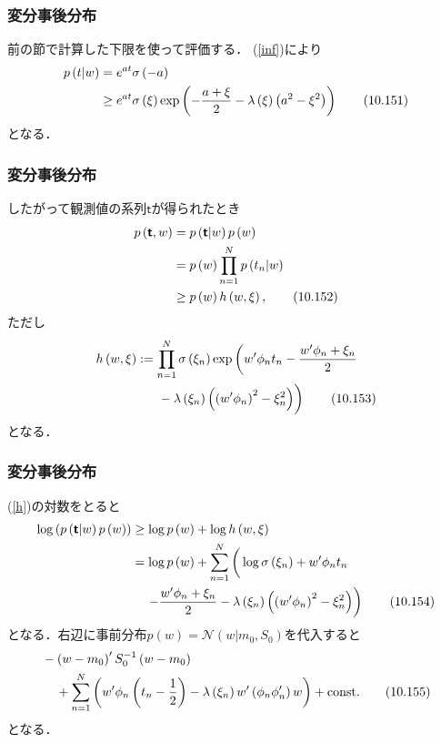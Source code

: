 \documentclass[10pt,usepdftitle=false,hyperref={unicode}]{beamer}
\newcommand{\paref}[1]{{\fontfamily{cmr}\selectfont (\ref{#1})}}
\newcommand{\parentheses}[1]{\left(#1\right)}
\newcommand{\const}{\mathrm{const.}}
\begin{document}
\begin{frame}
\frametitle{変分事後分布}
前の節で計算した下限を使って評価する．
\paref{inf}により
\begin{align}
    p\parentheses{t|w}
    &= e^{at}\sigma\parentheses{-a} \notag \\
    &\geq e^{at} \sigma\parentheses{\xi}\exp\parentheses{-\frac{a + \xi}{2} - \lambda\parentheses{\xi}\parentheses{a^2 - \xi^2}} \tag{10.151}
\end{align}
となる．
\end{frame}

\begin{frame}
\frametitle{変分事後分布}
したがって観測値の系列$\bm{\mathsf{t}}$が得られたとき
\begin{align}
    p\parentheses{\bm{\mathsf{t}},w}
    &= p\parentheses{\bm{\mathsf{t}}|w}p\parentheses{w} \notag \\
    &= p\parentheses{w} \prod_{n = 1}^N p\parentheses{t_n|w} \notag \\
    &\geq p\parentheses{w} h\parentheses{w,\xi}, \tag{10.152}
\end{align}
ただし
\begin{align}
    h\parentheses{w,\xi} &:= \prod_{n = 1}^N \sigma\parentheses{\xi_n}\exp\left( w'\phi_n t_n -\frac{w'\phi_n + \xi_n}{2}\right. \notag \\
                         &\phantom{:=}\ \left. \vphantom{\frac{w'\phi_n + \xi_n}{2}}
    - \lambda\parentheses{\xi_n}\parentheses{\parentheses{w'\phi_n}^2 - \xi_n^2}\right) \tag{10.153} \label{h}
\end{align}
となる．
\end{frame}

\begin{frame}
\frametitle{変分事後分布}
\paref{h}の対数をとると
\begin{align}
    \log\parentheses{p\parentheses{\bm{\mathsf{t}}|w}p\parentheses{w}}
    &\geq \log p\parentheses{w} + \log h\parentheses{w,\xi} \notag \\
    &= \log p\parentheses{w} + \sum_{n = 1}^N \left(\vphantom{\frac{w'\phi_n + \xi_n}{2}}  \log \sigma\parentheses{\xi_n} + w'\phi_n t_n \right. \notag \\
    &\phantom{\geq}\ \left.   - \frac{w'\phi_n + \xi_n}{2}  - \lambda \parentheses{\xi_n}\parentheses{\parentheses{w'\phi_n}^2 - \xi_n^2}\right) \tag{10.154}
\end{align}
となる．右辺に事前分布$p\parentheses{w} = \mathcal{N}\parentheses{w|m_0,S_0}$を代入すると
\begin{align}
    &- \parentheses{w - m_0}'S_0^{-1}\parentheses{w - m_0} \notag \\
    &\phantom{-}\ + \sum_{n = 1}^N \parentheses{w'\phi_n\parentheses{t_n - \frac{1}{2}}
      - \lambda\parentheses{\xi_n}w'\parentheses{\phi_n\phi_n'}w} + \const \tag{10.155} \label{g}
\end{align}
となる．
\end{frame}
\end{document}
